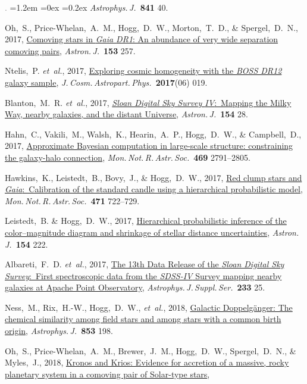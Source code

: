 \documentclass[10pt,letterpaper]{article}
\newcommand{\acronym}[1]{{\small{#1}}}
\newcommand{\foreign}[1]{\textsl{#1}}
\newcommand{\etal}{\foreign{et~al.}}
\newcommand{\project}[1]{\textsl{#1}}
\newcommand{\doi}[2]{\href{http://dx.doi.org/#1}{{#2}}}
\newcommand{\deemph}[1]{\textcolor{grey}{\footnotesize{#1}}}
\newcommand{\pubnumber}[1]{\deemph{{#1}.}}
\newcounter{refpubnum}
\newcommand{\hogglist}{%
    \rightmargin=0in
    \leftmargin=1.2em
    \topsep=0ex
    \partopsep=0pt
    \itemsep=0.2ex
    \parsep=0pt
    \itemindent=-1.0\leftmargin
    \listparindent=0.0\leftmargin
    \settowidth{\labelsep}{~}
    \usecounter{refpubnum}
  }
\begin{document}
\begin{list}{\pubnumber{\therefpubnum}}{\hogglist}
\textit{Astrophys.\,J.}\ \textbf{841} 40.
\item
Oh,~S., Price-Whelan,~A.~M., Hogg,~D.~W., Morton,~T.~D., \& Spergel,~D.~N., 2017,
\doi{10.3847/1538-3881/aa6ffd}{Comoving stars in \project{Gaia \acronym{DR1}}: An abundance of very wide separation comoving pairs},
\textit{Astron.\,J.}\ \textbf{153} 257.
\item
Ntelis,~P. \etal, 2017,
\doi{10.1088/1475-7516/2017/06/019}{Exploring cosmic homogeneity with the \project{\acronym{BOSS DR12}} galaxy sample},
\textit{J.\,Cosm.\,Astropart.\,Phys.}\ \textbf{2017}(06) 019.
\item
Blanton,~M.~R. \etal, 2017,
\doi{10.3847/1538-3881/aa7567}{\project{Sloan Digital Sky Survey \acronym{IV}}:\ Mapping the Milky Way, nearby galaxies, and the distant Universe},
\textit{Astron.\,J.}\ \textbf{154} 28.
\item
Hahn,~C., Vakili,~M., Walsh,~K., Hearin,~A.~P., Hogg,~D.~W., \& Campbell,~D., 2017,
\doi{10.1093/mnras/stx894}{Approximate Bayesian computation in large-scale structure: constraining the galaxy-halo connection},
\textit{Mon.\,Not.\,R.\,Astr.\,Soc.}\ \textbf{469} 2791--2805.
\item
Hawkins,~K., Leistedt,~B., Bovy,~J., \& Hogg,~D.~W., 2017,
\doi{10.1093/mnras/stx1655}{Red clump stars and \project{Gaia}:\ Calibration of the standard candle using a hierarchical probabilistic model},
\textit{Mon.\,Not.\,R.\,Astr.\,Soc.}\ \textbf{471} 722--729.
\item
Leistedt,~B. \& Hogg,~D.~W., 2017,
\doi{10.3847/1538-3881/aa91d5}{Hierarchical probabilistic inference of the color--magnitude diagram and shrinkage of stellar distance uncertainties},
\textit{Astron.\,J.}\ \textbf{154} 222.
\item
Albareti,~F.~D. \etal, 2017,
\doi{10.3847/1538-4365/aa8992}{The 13th Data Release of the \project{Sloan Digital Sky Survey}:\ First spectroscopic data from the \project{\acronym{SDSS-IV}} Survey mapping nearby galaxies at Apache Point Observatory},
\textit{Astrophys.\,J.\,Suppl.\,Ser.}\ \textbf{233} 25.
\item
Ness,~M., Rix,~H.-W., Hogg,~D.~W., \etal, 2018,
\doi{10.3847/1538-4357/aa9d8e}{Galactic Doppelg\"anger: The chemical similarity among field stars and among stars with a common birth origin},
\textit{Astrophys.\,J.}\ \textbf{853} 198.
\item
Oh,~S., Price-Whelan,~A.~M., Brewer,~J.~M., Hogg,~D.~W., Spergel,~D.~N., \& Myles,~J., 2018,
\doi{10.3847/1538-4357/aaab4d}{Kronos and Krios: Evidence for accretion of a massive, rocky planetary system in a comoving pair of Solar-type stars},

\end{list}
\end{document}
